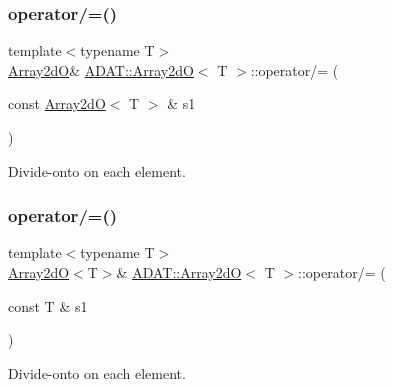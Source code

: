 \subsubsection{\texorpdfstring{operator/=()}{operator/=()}\hspace{0.1cm}{\footnotesize\ttfamily [2/4]}}
{\footnotesize\ttfamily template$<$typename T$>$ \\
\mbox{\hyperlink{classADAT_1_1Array2dO}{Array2dO}}\& \mbox{\hyperlink{classADAT_1_1Array2dO}{A\+D\+A\+T\+::\+Array2dO}}$<$ T $>$\+::operator/= (\begin{DoxyParamCaption}\item[{const \mbox{\hyperlink{classADAT_1_1Array2dO}{Array2dO}}$<$ T $>$ \&}]{s1 }\end{DoxyParamCaption})\hspace{0.3cm}{\ttfamily [inline]}}



Divide-\/onto on each element. 

\mbox{\label{classADAT_1_1Array2dO_ae0c954c51dfb1165b2afdd6152417fcf}} 
\subsubsection{\texorpdfstring{operator/=()}{operator/=()}\hspace{0.1cm}{\footnotesize\ttfamily [3/4]}}
{\footnotesize\ttfamily template$<$typename T$>$ \\
\mbox{\hyperlink{classADAT_1_1Array2dO}{Array2dO}}$<$T$>$\& \mbox{\hyperlink{classADAT_1_1Array2dO}{A\+D\+A\+T\+::\+Array2dO}}$<$ T $>$\+::operator/= (\begin{DoxyParamCaption}\item[{const T \&}]{s1 }\end{DoxyParamCaption})\hspace{0.3cm}{\ttfamily [inline]}}



Divide-\/onto on each element. 

\mbox{\label{classADAT_1_1Array2dO_ae0c954c51dfb1165b2afdd6152417fcf}} 
